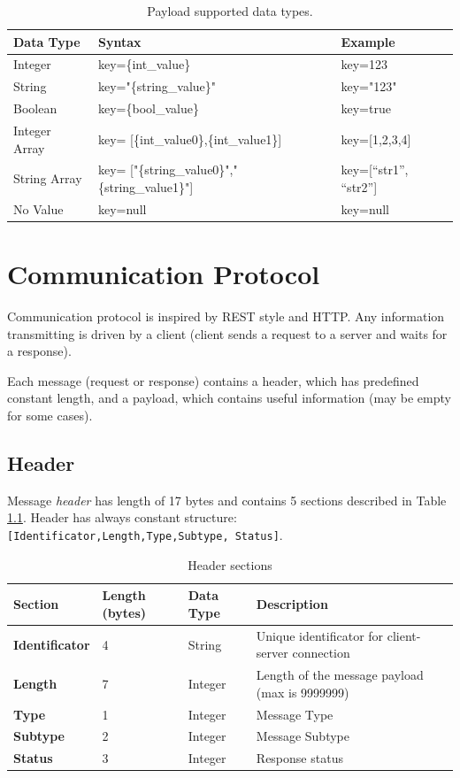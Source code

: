 \documentclass[english, sem, kiv, he, iso690alph, pdf, viewonly]{fasthesis}
\begin{document}
\begin{table}[h]
	\centering
	\begin{tabular}{|l|l|l|}
		\hline
		\textbf{Data Type} & \textbf{Syntax} & \textbf{Example} 	\\ \hline
		Integer & key=\{int\_value\} & key=123 \\ \hline
		String 	& key="\{string\_value\}" & key="123" \\ \hline
		Boolean	& key=\{bool\_value\} & key=true \\ \hline
		Integer Array	& key= [\{int\_value0\},\{int\_value1\}] & key=[1,2,3,4] \\ \hline
		String Array	& key= ["\{string\_value0\}","\{string\_value1\}"] & key=[“str1”, “str2”] \\ \hline
		No Value	& key=null & key=null \\ \hline
	\end{tabular}
	\caption{Payload supported data types.}
	\label{tab:payload_data_types}
\end{table}

\chapter{Communication Protocol}

Communication protocol is inspired by \ac{REST} style and \ac{HTTP}. Any information transmitting is driven by a client (client sends a request to a server and waits for a response).

Each message (request or response) contains a header, which has predefined constant length, and a payload, which contains useful information (may be empty for some cases).

\section{Header}

Message \textit{header} has length of 17 bytes and contains 5 sections described in Table \ref{tab:header_sections}. Header has always constant structure: \texttt{[Identificator,Length,Type,Subtype,
Status]}.

\begin{table}[h]
	\centering
	\begin{tabular}{|l|l|l|p{140pt}|}
		\hline
		\textbf{Section} & \textbf{Length (bytes)} & \textbf{Data Type} & \textbf{Description}	\\ \hline
		\textbf{Identificator} & 4 & String & Unique identificator for client-server connection \\ \hline
		\textbf{Length} & 7 & Integer & Length of the message payload (max is 9999999) \\ \hline
		\textbf{Type} & 1 & Integer & Message Type \\ \hline
		\textbf{Subtype} & 2 & Integer & Message Subtype \\ \hline
		\textbf{Status} & 3 & Integer & Response status \\ \hline
	\end{tabular}
	\caption{Header sections}
	\label{tab:header_sections}
\end{table}
\end{document}
